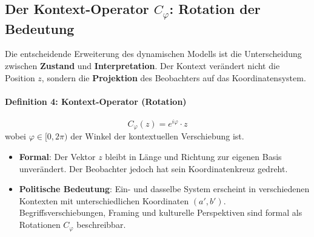 \documentclass[12pt, a4paper]{article}
\begin{document}
\begin{center}
\end{center}

\subsection{Der Kontext-Operator \(C_\varphi\): Rotation der Bedeutung}

Die entscheidende Erweiterung des dynamischen Modells ist die Unterscheidung zwischen \textbf{Zustand} und \textbf{Interpretation}. Der Kontext verändert nicht die Position \(z\), sondern die \textbf{Projektion} des Beobachters auf das Koordinatensystem.

\paragraph{Definition 4: Kontext-Operator (Rotation)}
\[
C_\varphi(z) = e^{i\varphi} \cdot z
\]
wobei \(\varphi \in [0, 2\pi)\) der Winkel der kontextuellen Verschiebung ist.

\begin{itemize}
    \item \textbf{Formal}: Der Vektor \(z\) bleibt in Länge und Richtung zur eigenen Basis unverändert. Der Beobachter jedoch hat sein Koordinatenkreuz gedreht.
    \item \textbf{Politische Bedeutung}: Ein- und dasselbe System erscheint in verschiedenen Kontexten mit unterschiedlichen Koordinaten \((a', b')\). Begriffsverschiebungen, Framing und kulturelle Perspektiven sind formal als Rotationen \(C_\varphi\) beschreibbar.
\end{itemize}
\end{document}
